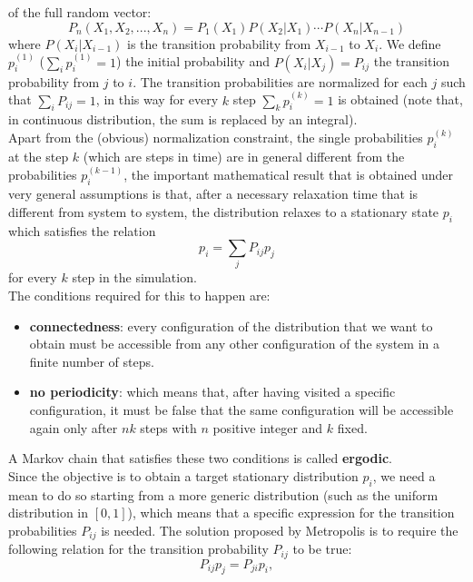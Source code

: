 of the full random vector:
\begin{equation}
    P_n(X_1,X_2,...,X_n)=P_1(X_1)P(X_2|X_1)\cdots P(X_n|X_{n-1})
\end{equation}
where $P(X_i|X_{i-1})$ is the transition probability from $X_{i-1}$ to $X_i$.
We define $p_i^{(1)}$ ($\sum_i p_i^{(1)}=1$) the initial probability and $P(X_i|X_j)=P_{ij}$ the transition probability from $j$ to $i$. The transition 
probabilities are normalized for each $j$ such that $\sum_i P_{ij}=1$, in this way for every $k$ step $\sum_k p_i^{(k)}=1$ is obtained (note that, in continuous 
distribution, the sum is replaced by an integral).\\
Apart from the (obvious) normalization constraint, the single probabilities $p_i^{(k)}$ at the step $k$ (which are steps in time) are in 
general different from the probabilities $p_i^{(k-1)}$, the important mathematical result that is obtained under very general assumptions is that, 
after a necessary relaxation time that is different from system to system, the distribution relaxes to a stationary state $p_i$ which satisfies the 
relation
\begin{equation}
    p_i=\sum_{j}P_{ij}p_j
\end{equation}
for every $k$ step in the simulation.\\
The conditions required for this to happen are:
\begin{itemize}
    \item \textbf{connectedness}: every configuration of the distribution that we want to obtain must be accessible from any other configuration of the system in a finite number of steps.
    \item \textbf{no periodicity}: which means that, after having visited a specific configuration, it must be false that the same configuration will be accessible again only after 
    $nk$ steps with $n$ positive integer and $k$ fixed.
\end{itemize}
A Markov chain that satisfies these two conditions is called \textbf{ergodic}.\\
Since the objective is to obtain a target stationary distribution $p_i$, we need a mean to do so starting from a more generic distribution (such as the uniform distribution 
in $[0,1]$), which means that a specific expression for the transition probabilities $P_{ij}$ is needed. The solution proposed 
by Metropolis \cite{metropolis1953equation} is to require the following relation for the transition probability $P_{ij}$ to be true:
\begin{equation}
    P_{ij}p_j=P_{ji}p_i,
    \label{detailed_balance condition}
\end{equation}
